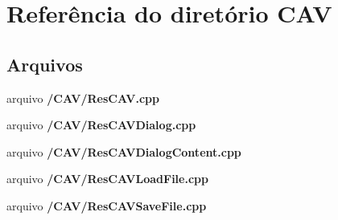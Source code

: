 \section{Referência do diretório C\+AV}
\label{dir_6c1158b90af9a8cba4ca6e43f4e1e261}
\subsection*{Arquivos}
\begin{DoxyCompactItemize}
\item 
arquivo {\bf /\+C\+A\+V/\+Res\+C\+A\+V.\+cpp}
\item 
arquivo {\bf /\+C\+A\+V/\+Res\+C\+A\+V\+Dialog.\+cpp}
\item 
arquivo {\bf /\+C\+A\+V/\+Res\+C\+A\+V\+Dialog\+Content.\+cpp}
\item 
arquivo {\bf /\+C\+A\+V/\+Res\+C\+A\+V\+Load\+File.\+cpp}
\item 
arquivo {\bf /\+C\+A\+V/\+Res\+C\+A\+V\+Save\+File.\+cpp}
\end{DoxyCompactItemize}
